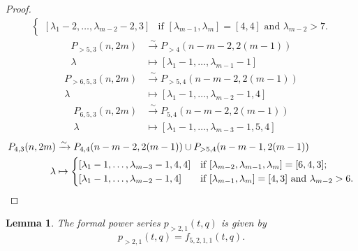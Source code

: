 \documentclass[a4paper, 12pt, reqno]{amsart}
\newtheorem{lemma}[theorem]{Lemma}
\theoremstyle{remark}
\begin{document}
\begin{proof}
\begin{align*}
\begin{cases}
                [\lambda_1 - 2, \dots, \lambda_{m - 2} - 2, 3] &\text{if }[\lambda_{m - 1}, \lambda_m] = [4, 4]\text{ and }\lambda_{m - 2} > 7.
              \end{cases}
  \end{align*}
  \begin{align*}
    P_{>5, 3}(n, 2m) &\xrightarrow{\sim} P_{>4}(n - m - 2, 2(m - 1)) \\
    \lambda &\mapsto [\lambda_1 - 1, \dots, \lambda_{m - 1} - 1]
  \end{align*}
  \begin{align*}
    P_{>6, 5, 3}(n, 2m) &\xrightarrow{\sim} P_{>5, 4}(n - m - 2, 2(m - 1)) \\
    \lambda &\mapsto [\lambda_1 - 1, \dots, \lambda_{m - 2} - 1, 4]
  \end{align*}
  \begin{align*}
    P_{6, 5, 3}(n, 2m) &\xrightarrow{\sim} P_{5, 4}(n - m - 2, 2(m - 1)) \\
    \lambda &\mapsto [\lambda_1 - 1, \dots, \lambda_{m - 3} - 1, 5, 4]
  \end{align*}
  \begin{align*}
    P_{4, 3}(n, 2m) &\xrightarrow{\sim} P_{4, 4}(n - m - 2, 2(m - 1)) \cup P_{>5, 4}(n - m - 1, 2(m - 1)) \\
    \lambda &\mapsto
              \begin{cases}
                [\lambda_1 - 1, \dots, \lambda_{m - 3} - 1, 4, 4] &\text{if }[\lambda_{m - 2}, \lambda_{m - 1}, \lambda_m] = [6, 4, 3]; \\
                [\lambda_1 - 1, \dots, \lambda_{m - 2} - 1, 4] &\text{if }[\lambda_{m - 1}, \lambda_m] = [4, 3]\text{ and }\lambda_{m - 2} > 6. \qedhere
              \end{cases}
  \end{align*}
\end{proof}

\begin{lemma}
  \label{lmm:3}
  The formal power series $p_{>2, 1}(t, q)$ is given by
  \begin{equation*}
    p_{>2, 1}(t, q)=f_{5, 2, 1, 1}(t, q).
  \end{equation*}
\end{lemma}
\end{document}
